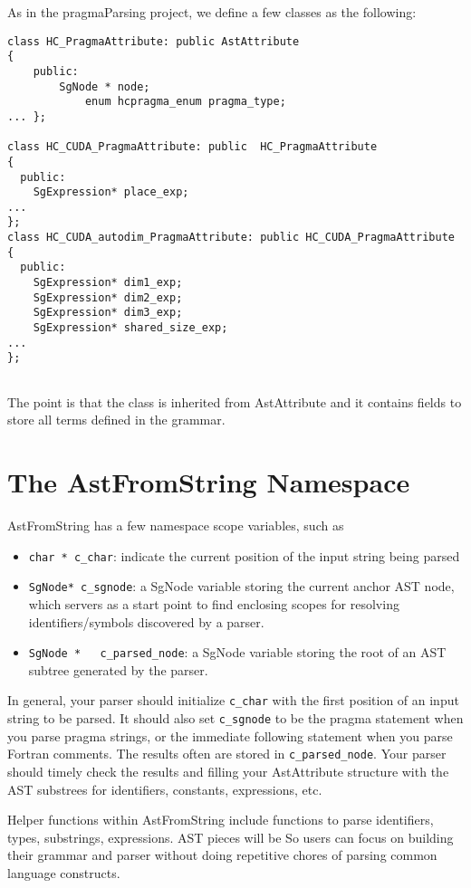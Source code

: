 As in the pragmaParsing project, we define a few classes as the following:

\begin{verbatim}
class HC_PragmaAttribute: public AstAttribute
{
    public:
        SgNode * node;
            enum hcpragma_enum pragma_type;
... };

class HC_CUDA_PragmaAttribute: public  HC_PragmaAttribute
{
  public:
    SgExpression* place_exp;
...
};
class HC_CUDA_autodim_PragmaAttribute: public HC_CUDA_PragmaAttribute
{
  public:
    SgExpression* dim1_exp;
    SgExpression* dim2_exp;
    SgExpression* dim3_exp;
    SgExpression* shared_size_exp;
...
};
            
\end{verbatim}
The point is that the class is inherited from AstAttribute and it contains fields to store all terms defined in the grammar. 

\section{The AstFromString Namespace}
AstFromString has a few namespace scope variables, such as
\begin{itemize}
\item \lstinline{char * c_char}: indicate the current position of the input string being parsed
\item \lstinline{SgNode* c_sgnode}: a SgNode variable storing the current anchor AST node, which servers as a start point to find enclosing scopes for resolving identifiers/symbols discovered by a parser. 
\item \lstinline{SgNode *   c_parsed_node}: a SgNode variable storing the root of an AST subtree generated by the parser.
\end{itemize}

In general, your parser should initialize \lstinline{c_char} with the first position of an input string to be parsed. 
It should also set \lstinline{c_sgnode} to be the pragma statement  when you parse pragma strings,  or the immediate following statement when you parse Fortran comments. 
The results often are stored in \lstinline{c_parsed_node}. Your parser should timely check the results and filling your AstAttribute structure with the AST substrees for identifiers, constants, expressions, etc.

Helper functions within AstFromString include functions to parse identifiers, types, substrings, expressions. AST pieces will be  So users can focus on building their grammar and parser without doing repetitive chores of parsing common language constructs. 

